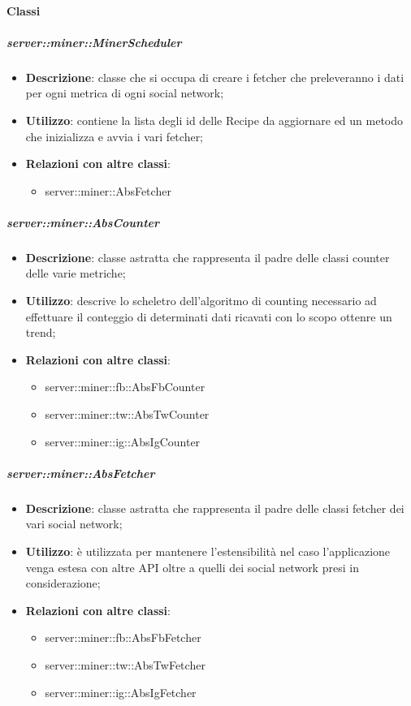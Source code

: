 \paragraph{Classi} %
		\subparagraph{server::miner::MinerScheduler} %
		\label{subp:server_miner_MinerScheduler}
			\begin{itemize}
				\item \textbf{Descrizione}: classe che si occupa di creare i fetcher che preleveranno i dati per ogni metrica di ogni social network;
				\item \textbf{Utilizzo}: contiene la lista degli id delle Recipe da aggiornare ed un metodo che inizializza e avvia i vari fetcher;
				\item \textbf{Relazioni con altre classi}:
					\begin{itemize}
						\item server::miner::AbsFetcher
					\end{itemize}
			\end{itemize}

		\subparagraph{server::miner::AbsCounter} %
		\label{subp:server_miner_AbsCounter}
			\begin{itemize}
				\item \textbf{Descrizione}: classe astratta che rappresenta il padre delle classi counter delle varie metriche;
				\item \textbf{Utilizzo}: descrive lo scheletro dell'algoritmo di counting necessario ad effettuare il conteggio di determinati dati ricavati con lo scopo ottenre un trend;
				\item \textbf{Relazioni con altre classi}:
					\begin{itemize}
						\item server::miner::fb::AbsFbCounter
						\item server::miner::tw::AbsTwCounter
						\item server::miner::ig::AbsIgCounter
					\end{itemize}
			\end{itemize}

		\subparagraph{server::miner::AbsFetcher} %
		\label{subp:server_miner_AbsFetcher}
				\begin{itemize}
				\item \textbf{Descrizione}: classe astratta che rappresenta il padre delle classi fetcher dei vari social network;
				\item \textbf{Utilizzo}: è utilizzata per mantenere l'estensibilità nel caso l'applicazione venga estesa con altre API  oltre a quelli dei social network presi in considerazione;
				\item \textbf{Relazioni con altre classi}:
					\begin{itemize}
						\item server::miner::fb::AbsFbFetcher
						\item server::miner::tw::AbsTwFetcher
						\item server::miner::ig::AbsIgFetcher
					\end{itemize}
			\end{itemize}

